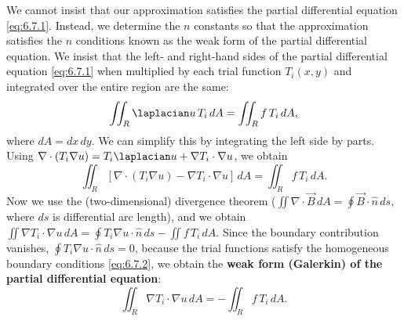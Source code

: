 We cannot insist that our approximation satisfies the partial differential equation \eqref{eq:6.7.1}.  Instead, we determine the $n$ constants so that the approximation satisfies the $n$ conditions known as the weak form of the partial differential equation.  We insist that the left- and right-hand sides of the partial differential equation \eqref{eq:6.7.1} when multiplied by each trial function $T_i(x,y)$ and integrated over the entire region are the same:
\begin{equation}
\iint_R \laplacian u\,T_i\,dA = \iint_R f\,T_i\,dA,
\label{eq:6.7.4}
\end{equation}
where $dA = dx\,dy$.  We can simplify this by integrating the left side by parts.  Using $\nabla\cdot(T_i\nabla u) = T_i\laplacian u + \nabla T_i \cdot \nabla u$, we obtain
\begin{equation}
\iint_R [\nabla\cdot(T_i\nabla u) - \nabla T_i \cdot \nabla u]\,dA = \iint_R f\,T_i\,dA.
\label{eq:6.7.5}
\end{equation}
Now we use the (two-dimensional) divergence theorem ($\iint \nabla\cdot\vec{B}\,dA = \oint \vec{B}\cdot\hat{n}\,ds$, where $ds$ is differential arc length), and we obtain $\iint \nabla T_i \cdot \nabla u\,dA = \oint T_i\nabla u \cdot \hat{n}\,ds - \iint f\,T_i\,dA$.  Since the boundary contribution vanishes, $\oint T_i\nabla u \cdot \hat{n}\,ds = 0$, because the trial functions satisfy the homogeneous boundary conditions \eqref{eq:6.7.2}, we obtain the \textbf{weak form (Galerkin) of the partial differential equation}:
\begin{equation}
\iint_R \nabla T_i \cdot \nabla u\,dA = -\iint_R f\,T_i\,dA.
\label{eq:6.7.6}
\end{equation}

